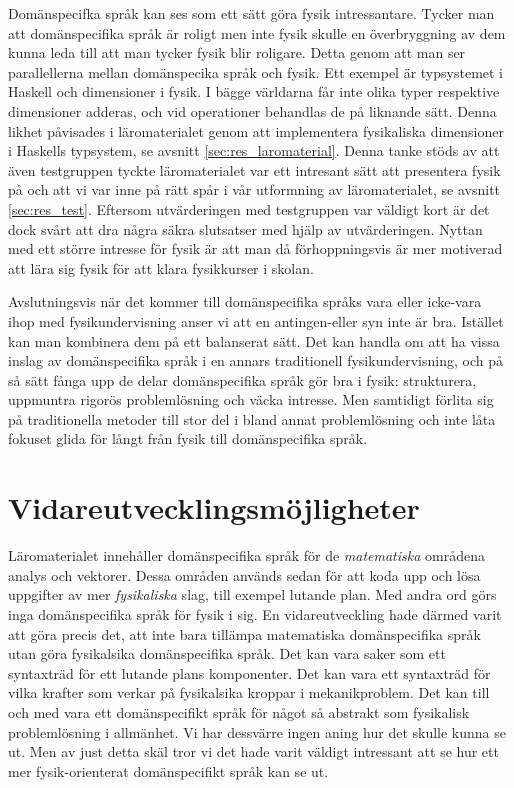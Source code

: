 \begin{draft}
Domänspecifka språk kan ses som ett sätt göra fysik intressantare. Tycker man att domänspecifika språk är roligt
men inte fysik skulle en överbryggning av dem kunna leda till att man tycker fysik
blir roligare. Detta genom att man ser parallellerna mellan
domänspecika språk och fysik. Ett exempel är typsystemet i Haskell och
dimensioner i fysik. I bägge världarna får inte olika typer respektive
dimensioner adderas, och vid operationer behandlas de på liknande sätt. Denna
likhet påvisades i läromaterialet genom att implementera fysikaliska dimensioner
i Haskells typsystem, se avsnitt \ref{sec:res_laromaterial}. Denna tanke stöds
av att även testgruppen tyckte läromaterialet var ett intresant sätt att
presentera fysik på och att vi var inne på rätt spår i vår utformning av läromaterialet, se avsnitt \ref{sec:res_test}. Eftersom utvärderingen med testgruppen var väldigt kort är det dock svårt att dra några säkra slutsatser med hjälp av utvärderingen. Nyttan med ett större
intresse för fysik är att man då förhoppningsvis är mer motiverad att lära sig
fysik för att klara fysikkurser i skolan. 

Avslutningsvis när det kommer till domänspecifika språks vara eller icke-vara ihop med fysikundervisning anser vi att en antingen-eller syn inte är bra. Istället kan man kombinera dem på ett balanserat sätt. Det kan handla om att ha vissa inslag av domänspecifika språk i en annars traditionell fysikundervisning, och på så sätt fånga upp de delar domänspecifika språk gör bra i fysik: strukturera, uppmuntra rigorös problemlösning och väcka intresse. Men samtidigt förlita sig på traditionella metoder till stor del i bland annat problemlösning och inte låta fokuset glida för långt från fysik till domänspecifika språk.


\section{Vidareutvecklingsmöjligheter}

Läromaterialet innehåller domänspecifika språk för de \textit{matematiska}
områdena analys och vektorer. Dessa områden används sedan för att koda upp och
lösa uppgifter av mer \textit{fysikaliska} slag, till exempel lutande plan. Med
andra ord görs inga domänspecifika språk för fysik i sig. En vidareutveckling
hade därmed varit att göra precis det, att inte bara tillämpa matematiska
domänspecifika språk utan göra fysikalsika domänspecifika språk. Det kan vara
saker som ett syntaxträd för ett lutande plans komponenter. Det kan vara ett
syntaxträd för vilka krafter som verkar på fysikalsika kroppar i mekanikproblem.
Det kan till och med vara ett domänspecifikt språk för något så abstrakt som
fysikalisk problemlösning i allmänhet. Vi har dessvärre ingen aning hur det
skulle kunna se ut. Men av just detta skäl tror vi det hade varit väldigt
intressant att se hur ett mer fysik-orienterat domänspecifikt språk kan se ut.


\end{draft}

